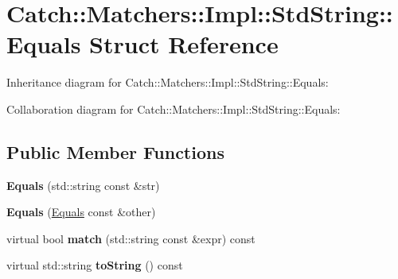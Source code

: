 \hypertarget{struct_catch_1_1_matchers_1_1_impl_1_1_std_string_1_1_equals}{}\section{Catch\+:\+:Matchers\+:\+:Impl\+:\+:Std\+String\+:\+:Equals Struct Reference}
\label{struct_catch_1_1_matchers_1_1_impl_1_1_std_string_1_1_equals}


Inheritance diagram for Catch\+:\+:Matchers\+:\+:Impl\+:\+:Std\+String\+:\+:Equals\+:


Collaboration diagram for Catch\+:\+:Matchers\+:\+:Impl\+:\+:Std\+String\+:\+:Equals\+:
\subsection*{Public Member Functions}
\begin{DoxyCompactItemize}
\item 
\hypertarget{struct_catch_1_1_matchers_1_1_impl_1_1_std_string_1_1_equals_a1bd99b381c6116a02b1e3ca200ca920c}{}{\bfseries Equals} (std\+::string const \&str)\label{struct_catch_1_1_matchers_1_1_impl_1_1_std_string_1_1_equals_a1bd99b381c6116a02b1e3ca200ca920c}

\item 
\hypertarget{struct_catch_1_1_matchers_1_1_impl_1_1_std_string_1_1_equals_acaa97de06aedf363ae803d65a975f5e4}{}{\bfseries Equals} (\hyperlink{struct_catch_1_1_matchers_1_1_impl_1_1_std_string_1_1_equals}{Equals} const \&other)\label{struct_catch_1_1_matchers_1_1_impl_1_1_std_string_1_1_equals_acaa97de06aedf363ae803d65a975f5e4}

\item 
\hypertarget{struct_catch_1_1_matchers_1_1_impl_1_1_std_string_1_1_equals_a00c8259a76c24da669e116662ededc70}{}virtual bool {\bfseries match} (std\+::string const \&expr) const \label{struct_catch_1_1_matchers_1_1_impl_1_1_std_string_1_1_equals_a00c8259a76c24da669e116662ededc70}

\item 
\hypertarget{struct_catch_1_1_matchers_1_1_impl_1_1_std_string_1_1_equals_a7a09449ff2f858981caf3b1f6c36d270}{}virtual std\+::string {\bfseries to\+String} () const \label{struct_catch_1_1_matchers_1_1_impl_1_1_std_string_1_1_equals_a7a09449ff2f858981caf3b1f6c36d270}

\end{DoxyCompactItemize}
